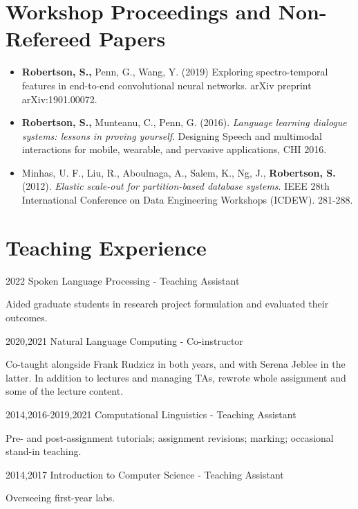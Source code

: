\documentclass{article}
\begin{document}
\section{Workshop Proceedings and Non-Refereed Papers}
\begin{itemize}
  \item \textbf{Robertson, S.,} Penn, G., Wang, Y. (2019) Exploring
    spectro-temporal features in end-to-end convolutional neural networks.
    arXiv preprint arXiv:1901.00072.

  \item \textbf{Robertson, S.,} Munteanu, C., Penn, G. (2016).
    \textit{Language learning dialogue systems: lessons in proving yourself}.
    Designing Speech and multimodal interactions for mobile, wearable, and
    pervasive applications, CHI 2016.

  \item Minhas, U. F., Liu, R., Aboulnaga, A., Salem, K., Ng, J.,
    \textbf{Robertson, S.} (2012). \textit{Elastic scale-out for
    partition-based database systems}. IEEE 28th International Conference on
    Data Engineering Workshops (ICDEW). 281-288.

\end{itemize}


\section{Teaching Experience}
\begin{CV}

  \item[2022] Spoken Language Processing - Teaching Assistant

    Aided graduate students in research project formulation and evaluated their
    outcomes.

  \item[2020,2021] Natural Language Computing - Co-instructor

    Co-taught alongside Frank Rudzicz in both years, and with Serena Jeblee in
    the latter. In addition to lectures and managing TAs, rewrote whole
    assignment and some of the lecture content.

  \item[2014,2016-2019,2021] Computational Linguistics - Teaching Assistant

    Pre- and post-assignment tutorials; assignment revisions; marking;
    occasional stand-in teaching.

  \item[2014,2017] Introduction to Computer Science - Teaching Assistant

    Overseeing first-year labs.

\end{CV}
\end{document}
